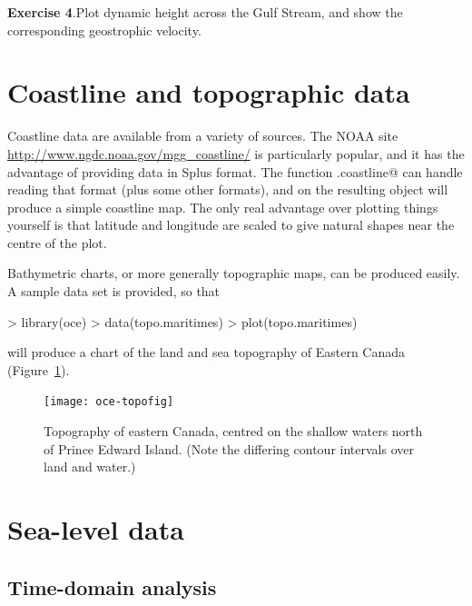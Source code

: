 \documentclass{article}
\newcommand{\workedexercise}[2]{
	\vspace{2ex plus 2ex minus 1ex}
	\begin{boxedminipage}[c]{0.95\linewidth}
		{\textbf{Exercise #1}.\hspace{1em}#2}
	\end{boxedminipage}
	\vspace{2ex plus 2ex minus 1ex}
}
\begin{document}
\workedexercise{4}{Plot dynamic height across the Gulf Stream, and show the corresponding geostrophic velocity.}

\section{Coastline and topographic data}


Coastline data are available from a variety of sources. The NOAA site
\url{http://www.ngdc.noaa.gov/mgg_coastline/} is particularly popular, and it
has the advantage of providing data in Splus format.  The function
\verb@read.coastline@ can handle reading that format (plus some other formats),
and \verb@plot@ on the resulting object will produce a simple coastline map.
The only real advantage over plotting things yourself is that latitude and
longitude are scaled to give natural shapes near the centre of the plot.

Bathymetric charts, or more generally topographic maps, can be produced easily.
A sample data set is provided, so that 
\begin{Schunk}
\begin{Sinput}
> library(oce)
> data(topo.maritimes)
> plot(topo.maritimes)
\end{Sinput}
\end{Schunk}
will produce a chart of the land and sea topography of Eastern Canada
(Figure~\ref{fig:topo}). 
\begin{figure}
\begin{center}
\texttt{[image: oce-topofig]}
\end{center}
\caption{Topography of eastern Canada, centred on the shallow waters north of
Prince Edward Island.  (Note the differing contour intervals over land and water.)}
\label{fig:topo}
\end{figure}

\section{Sea-level data}

\subsection{Time-domain analysis}

\end{document}
